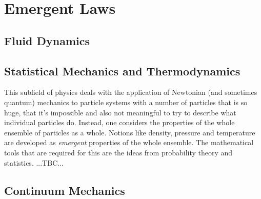 \section{Emergent Laws}

\subsection{Fluid Dynamics}







\subsection{Statistical Mechanics and Thermodynamics}
This subfield of physics deals with the application of Newtonian (and sometimes quantum) mechanics to particle systems with a number of particles that is so huge, that it's impossible and also not meaningful to try to describe what individual particles do. Instead, one considers the properties of the whole ensemble of particles as a whole. Notions like density, pressure and temperature are developed as \emph{emergent} properties of the whole ensemble. The mathematical tools that are required for this are the ideas from probability theory and statistics. ...TBC...




\subsection{Continuum Mechanics}


